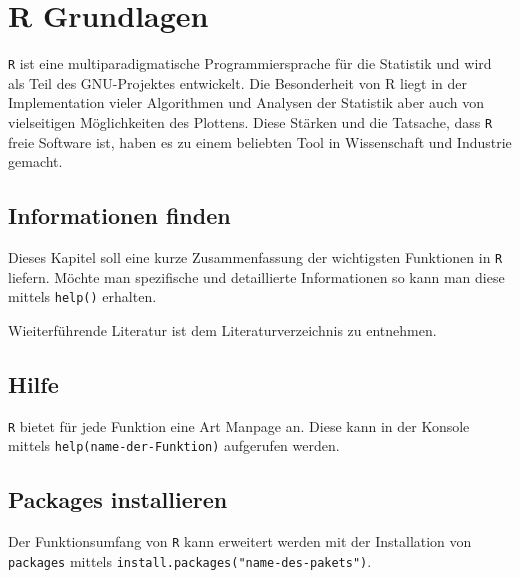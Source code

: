 



\chapter{R Grundlagen}
\lstinline{R} ist eine multiparadigmatische Programmiersprache für 
die Statistik und wird als Teil des GNU-Projektes entwickelt. Die 
Besonderheit von R liegt in der Implementation vieler Algorithmen
und Analysen der Statistik aber auch von vielseitigen Möglichkeiten 
des Plottens. Diese Stärken und die Tatsache, dass \lstinline{R} 
freie Software ist, haben es zu einem beliebten Tool in Wissenschaft
und Industrie gemacht.

\newpage


\section*{Informationen finden}
Dieses Kapitel soll eine kurze Zusammenfassung der wichtigsten 
Funktionen in \lstinline{R} liefern. Möchte man spezifische und
detaillierte Informationen so kann man diese mittels \lstinline{help()}
erhalten. 

Wieiterführende Literatur ist dem Literaturverzeichnis zu entnehmen.

\section{Hilfe}
\lstinline{R} bietet für jede Funktion eine Art Manpage an. 
Diese kann in der Konsole mittels \lstinline{help(name-der-Funktion)}
aufgerufen werden. 

\section{Packages installieren}
Der Funktionsumfang von \lstinline{R} kann erweitert werden mit der
Installation von \lstinline{packages} mittels 
\lstinline{install.packages("name-des-pakets")}.

